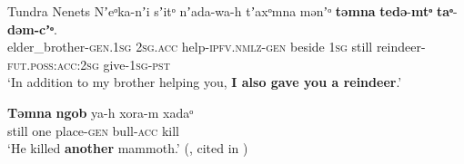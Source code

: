 \begin{exe}
	\ex \label{exAdditiveIntro}
	\begin{xlist}
		\exi{}Tundra Nenets
		\ex\label{exAdditiveIntroA}
		\gll Nʼeᵒka-nʼi sʼitᵒ nʼada-wa-h tʼaxᵒmna mənʼᵒ \textbf{təmna} \textbf{tedə}-\textbf{mtᵒ} \textbf{taᵒ}-\textbf{dəm-cʼᵒ}.\\
		elder\_brother-\textsc{gen}.1\textsc{sg} 2\textsc{sg}.\textsc{acc} help-\textsc{ipfv}.\textsc{nmlz}-\textsc{gen} beside 1\textsc{sg} still reindeer-\textsc{fut.poss}:\textsc{acc}:2\textsc{sg} give-1\textsc{sg}-\textsc{pst}\\
		\glt \lq In addition to my brother helping you, \textbf{I also gave you a reindeer}.' \parencite[371]{Nikolaeva2014}

		\ex\label{exAdditiveIntroB}
		\gll \textbf{Təmna} \textbf{ngob} ya-h xora-m xadaᵒ\\
		still one place-\textsc{gen}	 bull-\textsc{acc} kill\\
		\glt \lq He killed \textbf{another} mammoth.' (\cite[18]{Labanauskas1995}, cited in \cite[186]{Nikolaeva2014})
	\end{xlist}
\end{exe} 


